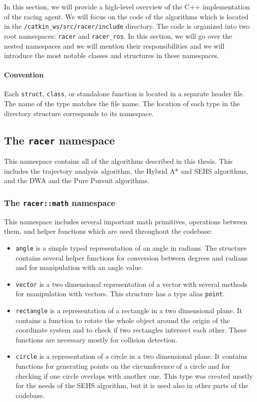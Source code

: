 In this section, we will provide a high-level overview of the C++ implementation of the racing agent. We will focus on the code of the algorithms which is located in the \texttt{/catkin\_ws/src/racer/include} directory. The code is organized into two root namespaces: \texttt{racer} and \texttt{racer\_ros}. In this section, we will go over the nested namespaces and we will mention their responsibilities and we will introduce the most notable classes and structures in these namespaces.

\paragraph{Convention} Each \texttt{struct}, \texttt{class}, or standalone function is located in a separate header file. The name of the type matches the file name. The location of each type in the directory structure corresponds to its namespace.

\subsection{The \texttt{racer} namespace}

This namespace contains all of the algorithms described in this thesis. This includes the trajectory analysis algorithm, the Hybrid A* and \gls*{SEHS} algorithms, and the \gls*{DWA} and the Pure Pursuit algorithms.

\subsubsection{The \texttt{racer::math} namespace}

This namespace includes several important math primitives, operations between them, and helper functions which are used throughout the codebase:

\begin{itemize}
	\item \texttt{angle} is a simple typed representation of an angle in radians. The structure contains several helper functions for conversion between degrees and radians and for manipulation with an angle value.

	\item \texttt{vector} is a two dimensional representation of a vector with several methods for manipulation with vectors. This structure has a type alias \texttt{point}.

	\item \texttt{rectangle} is a representation of a rectangle in a two dimensional plane. It contains a function to rotate the whole object around the origin of the coordinate system and to check if two rectangles intersect each other. These functions are necessary mostly for collision detection.

	\item \texttt{circle} is a representation of a circle in a two dimensional plane. It contains functions for generating points on the circumference of a circle and for checking if one circle overlaps with another one. This type was created mostly for the needs of the \gls{SEHS} algorithm, but it is used also in other parts of the codebase.
\end{itemize}


